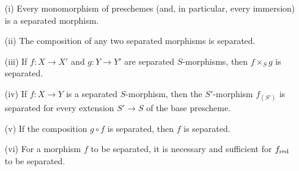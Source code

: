 \begin{proposition}[5.5.1]
\label{I.5.5.1}
\medskip\noindent
\begin{enumerate}
  \item[{\rm(i)}] Every monomorphism of preschemes (and, in particular, every immersion) is a separated morphism.
  \item[{\rm(ii)}] The composition of any two separated morphisms is separated.
  \item[{\rm(iii)}] If $f:X\to X'$ and $g:Y\to Y'$ are separated $S$-morphisms, then $f\times_S g$ is separated.
  \item[{\rm(iv)}] If $f:X\to Y$ is a separated $S$-morphism, then the $S'$-morphism $f_{(S')}$ is separated for every extension $S'\to S$ of the base prescheme.
  \item[{\rm(v)}] If the composition $g\circ f$ is separated, then $f$ is separated.
  \item[{\rm(vi)}] For a morphism $f$ to be separated, it is necessary and sufficient for $f_{\mathrm{red}}$  to be separated.
\end{enumerate}
\end{proposition}

